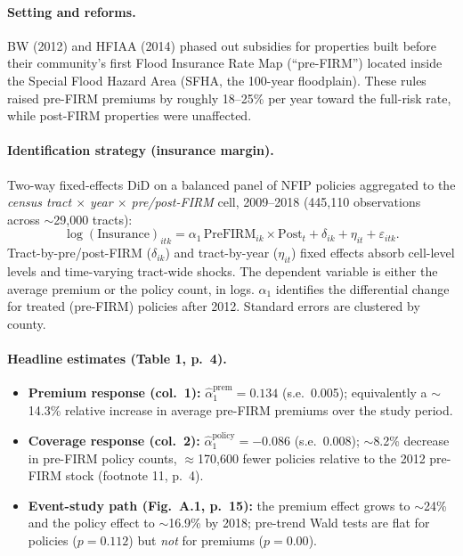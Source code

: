 \documentclass[11pt]{article}
\begin{document}
\paragraph{Setting and reforms.}
BW (2012) and HFIAA (2014) phased out subsidies for properties built before their
community's first Flood Insurance Rate Map (``pre-FIRM'') located inside the Special
Flood Hazard Area (SFHA, the 100-year floodplain). These rules raised pre-FIRM premiums
by roughly 18--25\% per year toward the full-risk rate, while post-FIRM properties were
unaffected.

\paragraph{Identification strategy (insurance margin).}
Two-way fixed-effects DiD on a balanced panel of NFIP policies aggregated to the
\emph{census tract $\times$ year $\times$ pre/post-FIRM} cell, 2009--2018 (445{,}110
observations across $\sim$29{,}000 tracts):
\begin{equation*}
\log(\text{Insurance})_{itk} = \alpha_1 \, \text{PreFIRM}_{ik}\times \text{Post}_t
+ \delta_{ik} + \eta_{it} + \varepsilon_{itk}.
\end{equation*}
Tract-by-pre/post-FIRM ($\delta_{ik}$) and tract-by-year ($\eta_{it}$) fixed effects
absorb cell-level levels and time-varying tract-wide shocks. The dependent variable is
either the average premium or the policy count, in logs. $\alpha_1$ identifies the
differential change for treated (pre-FIRM) policies after 2012. Standard errors are
clustered by county.

\paragraph{Headline estimates (Table 1, p.\ 4).}
\begin{itemize}
\item \textbf{Premium response (col.\ 1):} $\hat{\alpha}_1^{\text{prem}} = 0.134$
(s.e.\ 0.005); equivalently a $\sim$14.3\% relative increase in average pre-FIRM
premiums over the study period.
\item \textbf{Coverage response (col.\ 2):} $\hat{\alpha}_1^{\text{policy}} = -0.086$
(s.e.\ 0.008); $\sim$8.2\% decrease in pre-FIRM policy counts, $\approx$170{,}600
fewer policies relative to the 2012 pre-FIRM stock (footnote 11, p.\ 4).
\item \textbf{Event-study path (Fig.\ A.1, p.\ 15):} the premium effect grows to
$\sim$24\% and the policy effect to $\sim$16.9\% by 2018; pre-trend Wald tests are
flat for policies ($p=0.112$) but \emph{not} for premiums ($p=0.00$).
\end{itemize}
\end{document}
